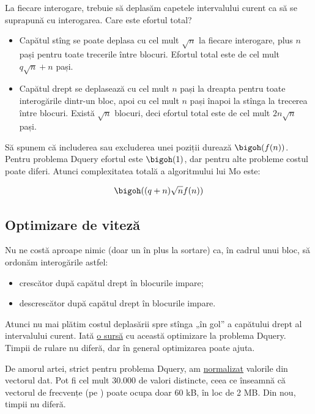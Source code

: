 La fiecare interogare, trebuie să deplasăm capetele intervalului curent ca să se suprapună cu interogarea. Care este efortul total?

\begin{itemize}
  \item Capătul stîng se poate deplasa cu cel mult $\sqrt{n}$ la fiecare interogare, plus $n$ pași pentru toate trecerile între blocuri. Efortul total este de cel mult $q \sqrt{n} + n$ pași.
  \item Capătul drept se deplasează cu cel mult $n$ pași la dreapta pentru toate interogările dintr-un bloc, apoi cu cel mult $n$ pași înapoi la stînga la trecerea între blocuri. Există $\sqrt{n}$ blocuri, deci efortul total este de cel mult $2n \sqrt n$ pași.
\end{itemize}

Să spunem că includerea sau excluderea unei poziții durează $\bigoh(f(n))$. Pentru problema Dquery efortul este $\bigoh(1)$, dar pentru alte probleme costul poate diferi. Atunci complexitatea totală a algoritmului lui Mo este:

$$\bigoh((q + n) \sqrt{n} f(n))$$

\subsection{Optimizare de viteză}

Nu ne costă aproape nimic (doar un  în plus la sortare) ca, în cadrul unui bloc, să ordonăm interogările astfel:

\begin{itemize}
  \item crescător după capătul drept în blocurile impare;
  \item descrescător după capătul drept în blocurile impare.
\end{itemize}

Atunci nu mai plătim costul deplasării spre stînga „în gol” a capătului drept al intervalului curent. Iată \href{https://github.com/CatalinFrancu/nerdvana/blob/main/problems/spoj/dquery/cata-mo-v2.cpp#L42}{o sursă} cu această optimizare la problema Dquery. Timpii de rulare nu diferă, dar în general optimizarea poate ajuta.

De amorul artei, strict pentru problema Dquery, am \href{https://github.com/CatalinFrancu/nerdvana/blob/main/problems/spoj/dquery/cata-mo-v3.cpp}{normalizat} valorile din vectorul dat. Pot fi cel mult 30.000 de valori distincte, ceea ce înseamnă că vectorul de frecvențe (pe ) poate ocupa doar 60 kB, în loc de 2 MB. Din nou, timpii nu diferă.

